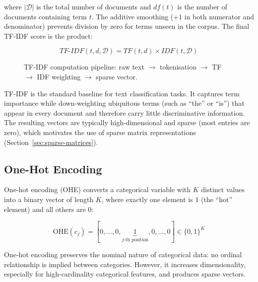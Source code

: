 \documentclass[10pt,a4paper]{article}
\begin{document}
where $|\mathcal{D}|$ is the total number of documents and $df(t)$ is the number of documents containing term $t$. The additive smoothing ($+1$ in both numerator and denominator) prevents division by zero for terms unseen in the corpus. The final TF-IDF score is the product:

\begin{equation}
TF\text{-}IDF(t, d, \mathcal{D}) = TF(t, d) \times IDF(t, \mathcal{D})
\label{eq:tfidf}
\end{equation}

\begin{figure}[H]
    \centering
    \caption{TF-IDF computation pipeline: raw text $\rightarrow$ tokenisation $\rightarrow$ TF $\rightarrow$ IDF weighting $\rightarrow$ sparse vector.}
    \label{fig:tfidf-computation}
\end{figure}

TF-IDF is the standard baseline for text classification tasks. It captures term importance while down-weighting ubiquitous terms (such as ``the'' or ``is'') that appear in every document and therefore carry little discriminative information. The resulting vectors are typically high-dimensional and sparse (most entries are zero), which motivates the use of sparse matrix representations (Section~\ref{sec:sparse-matrices}).

\subsection{One-Hot Encoding}
\label{sec:one-hot-encoding}

One-hot encoding (OHE) converts a categorical variable with $K$ distinct values into a binary vector of length $K$, where exactly one element is 1 (the ``hot'' element) and all others are 0:

\begin{equation}
\text{OHE}(c_j) = [0, \ldots, 0, \underbrace{1}_{j\text{-th position}}, 0, \ldots, 0] \in \{0, 1\}^K
\label{eq:ohe}
\end{equation}

One-hot encoding preserves the nominal nature of categorical data: no ordinal relationship is implied between categories. However, it increases dimensionality, especially for high-cardinality categorical features, and produces sparse vectors.
\end{document}
